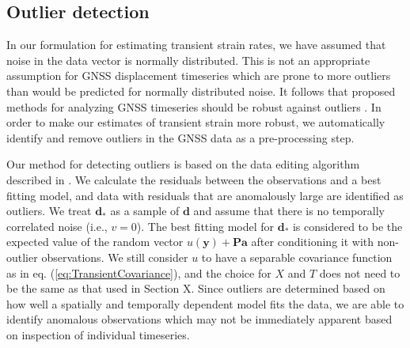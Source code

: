 \documentclass[10pt,a4paper]{article}
\begin{document}
\subsection{Outlier detection}\label{sec:Outlier}
In our formulation for estimating transient strain rates, we have assumed that noise in the data vector is normally distributed. This is not an appropriate assumption for GNSS displacement timeseries which are prone to more outliers than would be predicted for normally distributed noise. It follows that proposed methods for analyzing GNSS timeseries should be robust against outliers \citep[e.g.,][]{Blewitt2016}. In order to make our estimates of transient strain more robust, we automatically identify and remove outliers in the GNSS data as a pre-processing step.

Our method for detecting outliers is based on the data editing algorithm described in \citet{Gibbs2011}. We calculate the residuals between the observations and a best fitting model, and data with residuals that are anomalously large are identified as outliers. We treat $\bm{d}_*$ as a sample of $\bm{d}$ and assume that there is no temporally correlated noise (i.e., $v = 0$).  The best fitting model for $\bm{d}_*$ is considered to be the expected value of the random vector $u(\bm{y}) + \bm{P}\bm{a}$ after conditioning it with non-outlier observations.  We still consider $u$ to have a separable covariance function as in eq. (\ref{eq:TransientCovariance}), and the choice for $X$ and $T$ does not need to be the same as that used in Section X. Since outliers are determined based on how well a spatially and temporally dependent model fits the data, we are able to identify anomalous observations which may not be immediately apparent based on inspection of individual timeseries. 
\end{document}
